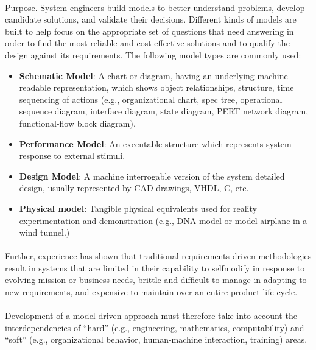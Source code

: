 \documentclass[a4paper,12pt,twoside]{report}
\begin{document}
			\paragraph{} {Purpose. System engineers build models to better understand problems, develop candidate solutions, and validate their decisions. Different kinds of models are built to help focus on the appropriate set of questions that need answering in order to find the most reliable and cost effective solutions and to qualify the design against its requirements. The following model types are commonly used:
				\begin{itemize}
					\item \textbf{Schematic Model}: A chart or diagram, having an underlying machine-readable representation, which shows object relationships, structure, time sequencing of actions (e.g., organizational chart, spec tree, operational sequence diagram, interface diagram, state diagram, PERT network diagram, functional-flow block diagram).
					\item \textbf{Performance Model}: An executable structure which represents system response to external stimuli.
					\item \textbf{Design Model}: A machine interrogable version of the system detailed design, usually represented by CAD drawings, VHDL, C, etc.
					\item  \textbf{Physical model}: Tangible physical equivalents used for reality experimentation and demonstration (e.g., DNA model or model airplane in a wind tunnel.)
				\end{itemize}
			}
			\paragraph{}{Further, experience has shown that traditional requirements-driven methodologies result in systems that are limited in their capability to selfmodify in response to evolving mission or business needs, brittle and difficult to manage in adapting to new requirements, and expensive to maintain over an entire product life cycle.
			}
			
			\paragraph{} {Development of a model-driven approach must therefore take into account the interdependencies of “hard” (e.g., engineering, mathematics, computability) and “soft” (e.g., organizational behavior, human-machine interaction, training) areas. \cite{FoundationalConceptsMDSD}
			}
			
\end{document}
